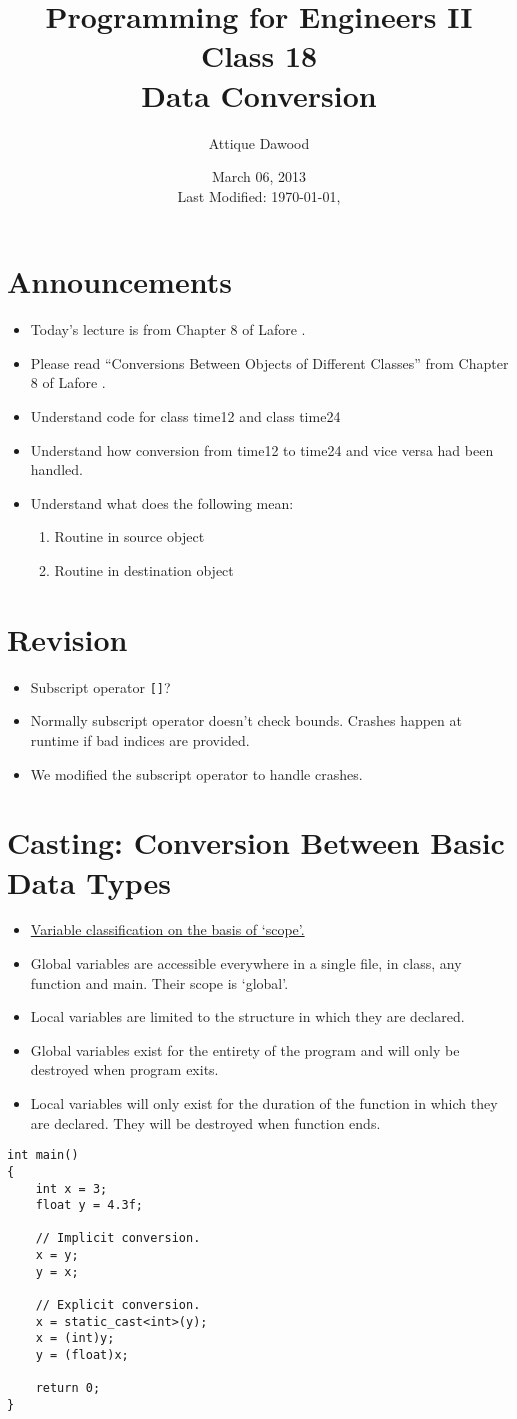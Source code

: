 \documentclass[12pt,a4paper]{article}
\title{\vspace{-2cm}Programming for Engineers II\\Class 18\\Data Conversion}
\author{Attique Dawood}
\date{March 06, 2013\\[0.2cm] Last Modified: \today, \currenttime}
\begin{document}
\maketitle
\section{Announcements}
\begin{itemize}
\item Today's lecture is from Chapter 8 of Lafore \cite{Lafore}.
\item Please read ``Conversions Between Objects of Different Classes'' from Chapter 8 of Lafore \cite{Lafore}.
\item Understand code for class time12 and class time24
\item Understand how conversion from time12 to time24 and vice versa had been handled.
\item Understand what does the following mean:
\begin{enumerate}
\item Routine in source object
\item Routine in destination object
\end{enumerate}
\end{itemize}
\section{Revision}
\begin{itemize}
\item Subscript operator \verb|[]|?
\item Normally subscript operator doesn't check bounds. Crashes happen at runtime if bad indices are provided.
\item We modified the subscript operator to handle crashes.
\end{itemize}
\section{Casting: Conversion Between Basic Data Types}
\begin{itemize}
\item \underline{Variable classification on the basis of `scope'.}
\item Global variables are accessible everywhere in a single file, in class, any function and main. Their scope is `global'.
\item Local variables are limited to the structure in which they are declared.
\item Global variables exist for the entirety of the program and will only be destroyed when program exits.
\item Local variables will only exist for the duration of the function in which they are declared. They will be destroyed when function ends.
\end{itemize}
\begin{lstlisting}[caption={Variable Casting}]
int main()
{
	int x = 3;
	float y = 4.3f;

	// Implicit conversion.
	x = y;
	y = x;

	// Explicit conversion.
	x = static_cast<int>(y);
	x = (int)y;
	y = (float)x;
	
	return 0;
}
\end{lstlisting}
\end{document}
